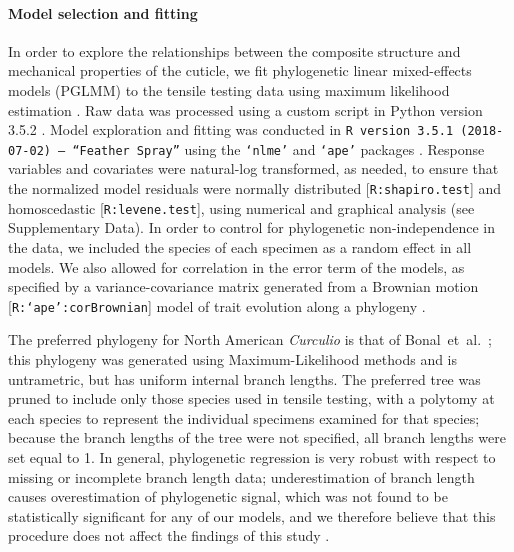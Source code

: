 \documentclass[twocolumn, linenumbers, superscriptaddress, nofootinbib]{revtex4-1}
\begin{document}
			\paragraph*{Model selection and fitting}
				In order to explore the relationships between the composite structure and mechanical properties of the cuticle, we fit phylogenetic linear mixed-effects models (PGLMM) to the tensile testing data using maximum likelihood estimation \cite{Galecki2013, Hadfield2010, Houseworth2004, Stone2011glmm}.
				Raw data was processed using a custom script in Python version 3.5.2 \cite{Python}.
				Model exploration and fitting was conducted in \texttt{R version 3.5.1 (2018-07-02) -- ``Feather Spray''} using the \texttt{`nlme'} and \texttt{`ape'} packages \cite{Rcite, Ape, Nlme}.
				Response variables and covariates were natural-log transformed, as needed, to ensure that the normalized model residuals were normally distributed [\texttt{R:shapiro.test}] and homoscedastic [\texttt{R:levene.test}], using numerical and graphical analysis (see Supplementary Data).
				In order to control for phylogenetic non-independence in the data, we included the species of each specimen as a random effect in all models.
				We also allowed for correlation in the error term of the models, as specified by a variance-covariance matrix generated from a Brownian motion [\texttt{R:`ape':corBrownian}] model of trait evolution along a phylogeny \cite{Munkemuller2012, Ape}.
				
				The preferred phylogeny for North American \textit{Curculio} is that of Bonal~et~al.~\cite{Bonal2016}; this phylogeny was generated using Maximum-Likelihood methods and is untrametric, but has uniform internal branch lengths.
				The preferred tree was pruned to include only those species used in tensile testing, with a polytomy at each species to represent the individual specimens examined for that species; because the branch lengths of the tree were not specified, all branch lengths were set equal to 1.
				In general, phylogenetic regression is very robust with respect to missing or incomplete branch length data; underestimation of branch length causes overestimation of phylogenetic signal, which was not found to be statistically significant for any of our models, and we therefore believe that this procedure does not affect the findings of this study \cite{Munkemuller2012, Molina2017, Stone2011star}.
				
\end{document}
